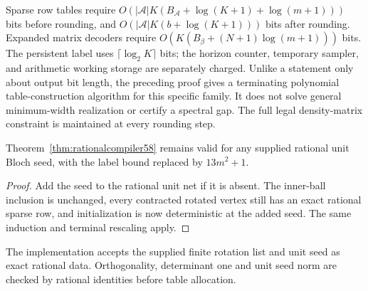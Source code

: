 Sparse row tables require
$O(|\mathcal A|K(B_{\mathcal A}+\log(K+1)+\log(m+1)))$ bits before
rounding, and $O(|\mathcal A|K(b+\log(K+1)))$ bits after rounding.
Expanded matrix decoders require
$O(K(B_\beta+(N+1)\log(m+1)))$ bits. The persistent label uses
$\lceil\log_2 K\rceil$ bits; the horizon counter, temporary sampler, and
arithmetic working storage are separately charged. Unlike a statement
only about output bit length, the preceding proof gives a terminating
polynomial table-construction algorithm for this specific family. It
does not solve general minimum-width realization or certify a spectral
gap. The full legal density-matrix constraint is maintained at every
rounding step.

\begin{proposition}\label{prop:seedextension59}
Theorem~\ref{thm:rationalcompiler58} remains valid for any supplied
rational unit Bloch seed, with the label bound replaced by $13m^2+1$.
\end{proposition}
\begin{proof}
Add the seed to the rational unit net if it is absent. The inner-ball
inclusion is unchanged, every contracted rotated vertex still has an
exact rational sparse row, and initialization is now deterministic at
the added seed. The same induction and terminal rescaling apply.
\end{proof}
The implementation accepts the supplied finite rotation list and unit
seed as exact rational data. Orthogonality, determinant one and unit
seed norm are checked by rational identities before table allocation.
